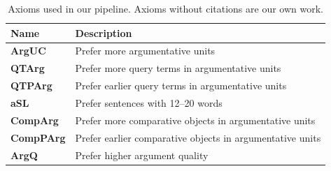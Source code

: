         \begin{table}
            \begin{tabular}{ll}
                \toprule
                Name & Description\\
                \midrule
                \textbf{ArgUC} & Prefer more argumentative units~\cite{bondarenko:2018}\\
                \textbf{QTArg} & Prefer more query terms in argumentative units~\cite{bondarenko:2018}\\
                \textbf{QTPArg} & Prefer earlier query terms in argumentative units~\cite{bondarenko:2018}\\
                \textbf{aSL} & Prefer sentences with 12–20 words~\cite{bondarenkoaxiomatic}\\
                \textbf{CompArg} & Prefer more comparative objects in argumentative units\\
                \textbf{CompPArg} & Prefer earlier comparative objects in argumentative units\\
                \textbf{ArgQ} & Prefer higher argument quality\\ 
                \bottomrule
            \end{tabular}
            \caption{Axioms used in our pipeline. Axioms without citations are our own work.}
            \label{tab:axioms}
        \end{table}

